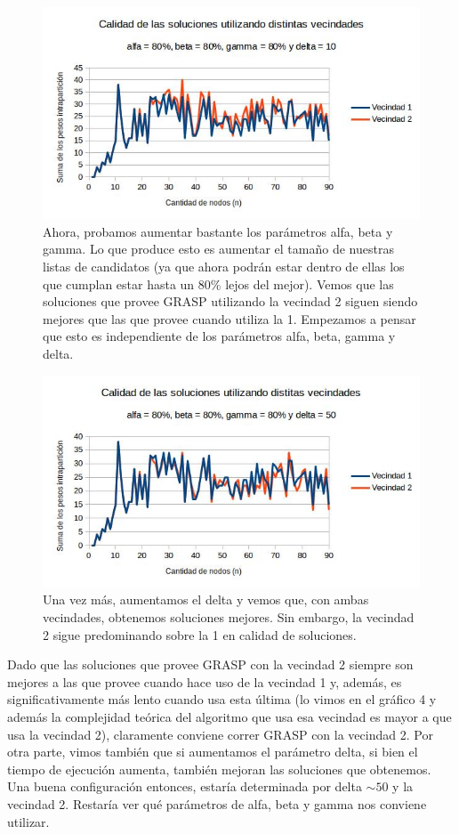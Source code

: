 \documentclass[a4paper]{article}
\begin{document}
\begin{figure}[H]
\centering
\includegraphics[scale=0.7]{80808010.jpg}\caption{Ahora, probamos aumentar bastante los parámetros alfa, beta y gamma. Lo que produce esto es aumentar el tamaño de nuestras listas de candidatos (ya que ahora podrán estar dentro de ellas los que cumplan estar hasta un 80\% lejos del mejor). Vemos que las soluciones que provee GRASP utilizando la vecindad 2 siguen siendo mejores que las que provee cuando utiliza la 1. Empezamos a pensar que esto es independiente de los parámetros alfa, beta, gamma y delta.}
\end{figure}

\begin{figure}[H]
\centering
\includegraphics[scale=0.7]{80808050.jpg}\caption{Una vez más, aumentamos el delta y vemos que, con ambas vecindades, obtenemos soluciones mejores. Sin embargo, la vecindad 2 sigue predominando sobre la 1 en calidad de soluciones.}
\end{figure}
\noindent Dado que las soluciones que provee GRASP con la vecindad 2 siempre son mejores a las que provee cuando hace uso de la vecindad 1 y, además, es significativamente más lento cuando usa esta última (lo vimos en el gráfico 4 y además la complejidad teórica del algoritmo que usa esa vecindad es mayor a que usa la vecindad 2), claramente conviene correr GRASP con la vecindad 2. Por otra parte, vimos también que si aumentamos el parámetro delta, si bien el tiempo de ejecución aumenta, también mejoran las soluciones que obtenemos. Una buena configuración entonces, estaría determinada por delta $\sim 50$ y la vecindad 2. Restaría ver qué parámetros de alfa, beta y gamma nos conviene utilizar.
\end{document}
